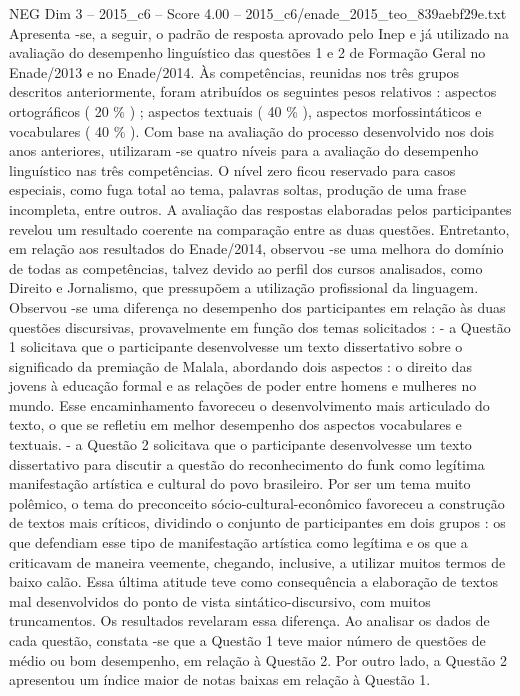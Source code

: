 \begin{textsample}{NEG Dim 3 – 2015\_c6 – Score 4.00 – 2015\_c6/enade\_2015\_teo\_839aebf29e.txt}
Apresenta -se, a seguir, o padrão de resposta aprovado pelo Inep e já utilizado na avaliação do desempenho linguístico das questões 1 e 2 de Formação Geral no Enade/2013 e no Enade/2014.
Às competências, reunidas nos três grupos descritos anteriormente, foram atribuídos os seguintes pesos relativos : aspectos ortográficos ( 20 \% ) ; aspectos textuais ( 40 \% ), aspectos morfossintáticos e vocabulares ( 40 \% ).
Com base na avaliação do processo desenvolvido nos dois anos anteriores, utilizaram -se quatro níveis para a avaliação do desempenho linguístico nas três competências.
O nível zero ficou reservado para casos especiais, como fuga total ao tema, palavras soltas, produção de uma frase incompleta, entre outros.
A avaliação das respostas elaboradas pelos participantes revelou um resultado coerente na comparação entre as duas questões.
Entretanto, em relação aos resultados do Enade/2014, observou -se uma melhora do domínio de todas as competências, talvez devido ao perfil dos cursos analisados, como Direito e Jornalismo, que pressupõem a utilização profissional da linguagem.
Observou -se uma diferença no desempenho dos participantes em relação às duas questões discursivas, provavelmente em função dos temas solicitados : - a Questão 1 solicitava que o participante desenvolvesse um texto dissertativo sobre o significado da premiação de Malala, abordando dois aspectos : o direito das jovens à educação formal e as relações de poder entre homens e mulheres no mundo.
Esse encaminhamento favoreceu o desenvolvimento mais articulado do texto, o que se refletiu em melhor desempenho dos aspectos vocabulares e textuais. - a Questão 2 solicitava que o participante desenvolvesse um texto dissertativo para discutir a questão do reconhecimento do funk como legítima manifestação artística e cultural do povo brasileiro.
Por ser um tema muito polêmico, o tema do preconceito sócio-cultural-econômico favoreceu a construção de textos mais críticos, dividindo o conjunto de participantes em dois grupos : os que defendiam esse tipo de manifestação artística como legítima e os que a criticavam de maneira veemente, chegando, inclusive, a utilizar muitos termos de baixo calão.
Essa última atitude teve como consequência a elaboração de textos mal desenvolvidos do ponto de vista sintático-discursivo, com muitos truncamentos.
Os resultados revelaram essa diferença.
Ao analisar os dados de cada questão, constata -se que a Questão 1 teve maior número de questões de médio ou bom desempenho, em relação à Questão 2.
Por outro lado, a Questão 2 apresentou um índice maior de notas baixas em relação à Questão 1.

\end{textsample}
